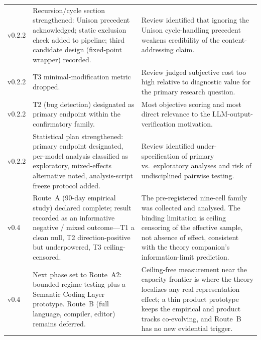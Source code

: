 \documentclass[11pt]{article}
\begin{document}
\begin{longtable}{@{}p{2cm}p{4cm}p{6.5cm}@{}}
  v0.2.2 &
    Recursion/cycle section strengthened: Unison precedent
    acknowledged; static exclusion check added to pipeline;
    third candidate design (fixed-point wrapper) recorded. &
    Review identified that ignoring the Unison cycle-handling
    precedent weakens credibility of the content-addressing claim. \\
  \addlinespace

  v0.2.2 &
    T3 minimal-modification metric dropped. &
    Review judged subjective cost too high relative to diagnostic
    value for the primary research question. \\
  \addlinespace

  v0.2.2 &
    T2 (bug detection) designated as primary endpoint within the
    confirmatory family. &
    Most objective scoring and most direct relevance to the
    LLM-output-verification motivation. \\
  \addlinespace

  v0.2.2 &
    Statistical plan strengthened: primary endpoint designated,
    per-model analysis classified as exploratory, mixed-effects
    alternative noted, analysis-script freeze protocol added. &
    Review identified under-specification of primary vs.\
    exploratory analyses and risk of undisciplined pairwise
    testing. \\
  \addlinespace

  v0.4 &
    Route~A (90-day empirical study) declared complete; result recorded
    as an informative negative / mixed outcome---T1 a clean null, T2
    direction-positive but underpowered, T3 ceiling-censored. &
    The pre-registered nine-cell family was collected and analysed.  The
    binding limitation is ceiling censoring of the effective sample, not
    absence of effect, consistent with the theory companion's
    information-limit prediction. \\
  \addlinespace

  v0.4 &
    Next phase set to Route~A2: bounded-regime testing plus a Semantic
    Coding Layer prototype.  Route~B (full language, compiler, editor)
    remains deferred. &
    Ceiling-free measurement near the capacity frontier is where the
    theory localizes any real representation effect; a thin product
    prototype keeps the empirical and product tracks co-evolving, and
    Route~B has no new evidential trigger. \\
  \bottomrule
\end{longtable}


\end{document}
